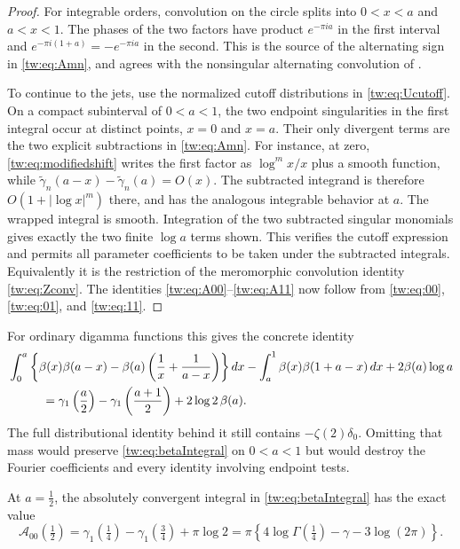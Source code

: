 \begin{proof}
For integrable orders, convolution on the circle splits into
$0<x<a$ and $a<x<1$. The phases of the two factors have product
$e^{-\pi ia}$ in the first interval and
$e^{-\pi i(1+a)}=-e^{-\pi ia}$ in the second. This is the source
of the alternating sign in \eqref{tw:eq:Amn}, and agrees with
the nonsingular alternating convolution of
\cite[Theorem~1.13]{ZhuHuKim2026}.

To continue to the jets, use the normalized cutoff distributions in
\eqref{tw:eq:Ucutoff}. On a compact subinterval of $0<a<1$, the
two endpoint singularities in the first integral occur at distinct
points, $x=0$ and $x=a$. Their only divergent terms are the two
explicit subtractions in \eqref{tw:eq:Amn}. For instance, at zero,
\eqref{tw:eq:modifiedshift} writes the first factor as
$\log^m x/x$ plus a smooth function, while
$\widetilde\gamma_n(a-x)-\widetilde\gamma_n(a)=O(x)$.
The subtracted integrand is therefore
$O(1+|\log x|^m)$ there, and has the analogous integrable behavior
at $a$. The wrapped integral is smooth. Integration of the two
subtracted singular monomials gives exactly the two finite
$\log a$ terms shown. This verifies the cutoff expression and
permits all parameter coefficients to be taken under the
subtracted integrals. Equivalently it is the restriction of the
meromorphic convolution identity \eqref{tw:eq:Zconv}. The identities
\eqref{tw:eq:A00}--\eqref{tw:eq:A11} now follow from
\eqref{tw:eq:00}, \eqref{tw:eq:01}, and \eqref{tw:eq:11}.
\end{proof}

For ordinary digamma functions this gives the concrete identity
\begin{align}
 &\int_0^a\left\{\beta(x)\beta(a-x)
               -\beta(a)\left(\frac1x+\frac1{a-x}\right)\right\}dx
       -\int_a^1\beta(x)\beta(1+a-x)\,dx
       +2\beta(a)\log a\notag\\
 &\hspace{1cm}=\gamma_1\left(\frac a2\right)
          -\gamma_1\left(\frac{a+1}{2}\right)
                         +2\log2\,\beta(a).
 \label{tw:eq:betaIntegral}
\end{align}
The full distributional identity behind it still contains
$-\zeta(2)\delta_0$. Omitting that mass would preserve
\eqref{tw:eq:betaIntegral} on $0<a<1$ but would destroy the
Fourier coefficients and every identity involving endpoint tests.

\begin{corollary}
\label{tw:cor:quarterGamma}
At $a=\tfrac12$, the absolutely convergent integral in
\eqref{tw:eq:betaIntegral} has the exact value
\begin{equation}\label{tw:eq:quarterGamma}
 \mathcal A_{00}\left(\tfrac12\right)
 =\gamma_1\left(\tfrac14\right)-\gamma_1\left(\tfrac34\right)
                                      +\pi\log2
 =\pi\left\{4\log\Gamma\left(\tfrac14\right)
                          -\gamma-3\log(2\pi)\right\}.
\end{equation}
\end{corollary}

